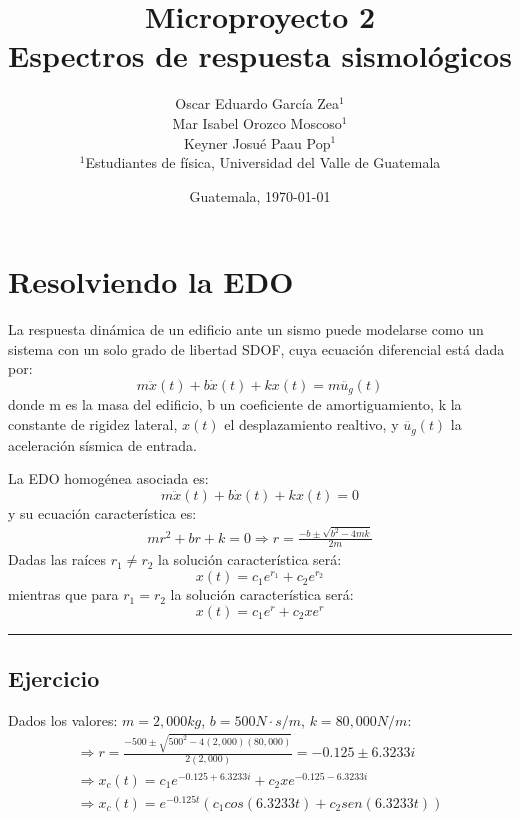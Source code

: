 \documentclass[12pt,letterpaper]{article}
\title{\textbf{Microproyecto 2}\\[0.5ex]Espectros de respuesta sismológicos}
\author{
  Oscar Eduardo García Zea$^{1}$\\
  Mar Isabel Orozco Moscoso$^{1}$\\
  Keyner Josué Paau Pop$^{1}$\\
  {\small $^{1}$Estudiantes de física, Universidad del Valle de Guatemala}
}
\date{Guatemala, \today}
\begin{document}
\thispagestyle{fancy}
\maketitle %

\section{Resolviendo la EDO}
La respuesta dinámica de un edificio ante un sismo puede modelarse como un sistema con un solo grado de libertad SDOF, cuya
ecuación diferencial está dada por:
\begin{equation*}
    m\ddot{x}(t) + b\dot{x}(t) + kx(t) = m\ddot{u_g}(t) 
\end{equation*}
donde m es la masa del edificio, b un coeficiente de amortiguamiento, k la constante de rigidez lateral, $x(t)$ el desplazamiento realtivo,
y $\ddot{u_g}(t)$ la aceleración sísmica de entrada.

La EDO homogénea asociada es:
\begin{equation*}
    m\ddot{x}(t) + b\dot{x}(t) + kx(t) = 0
\end{equation*}
y su ecuación característica es:
\begin{gather*}
    mr^2 + br + k = 0
    \Rightarrow r = \frac{-b\pm \sqrt{b^2-4mk}}{2m}
\end{gather*}
Dadas las raíces $r_1 \neq r_2$ la solución característica será:
\begin{equation*}
    x(t) = c_1e^{r_1}+c_2e^{r_2}
\end{equation*}
mientras que para $r_1 = r_2$ la solución característica será:
\begin{equation*}
x(t) = c_1e^{r}+c_2xe^{r}
\end{equation*}

\noindent\rule{\textwidth}{0.4pt}

\subsection{Ejercicio}
Dados los valores: $m = 2,000 kg$,  $b = 500 N \cdot s/m$,  $k = 80,000 N/m$:
\begin{gather*}
    \Rightarrow r = \frac{-500\pm \sqrt{500^2-4(2,000)(80,000)}}{2(2,000)} =  -0.125 \pm 6.3233i \\
    \Rightarrow x_c(t) = c_1e^{-0.125 + 6.3233i}+c_2xe^{-0.125 - 6.3233i} \\
    \Rightarrow x_c(t) = e^{-0.125t}(c_1cos(6.3233t)+c_2sen(6.3233t))
\end{gather*}
\end{document}
